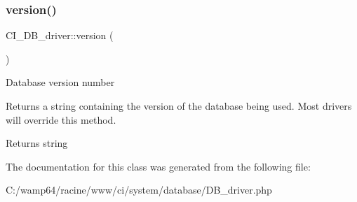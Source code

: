 \subsubsection{\texorpdfstring{version()}{version()}}
{\footnotesize\ttfamily C\+I\+\_\+\+D\+B\+\_\+driver\+::version (\begin{DoxyParamCaption}{ }\end{DoxyParamCaption})}

Database version number

Returns a string containing the version of the database being used. Most drivers will override this method.

\begin{DoxyReturn}{Returns}
string 
\end{DoxyReturn}


The documentation for this class was generated from the following file\+:\begin{DoxyCompactItemize}
\item 
C\+:/wamp64/racine/www/ci/system/database/D\+B\+\_\+driver.\+php\end{DoxyCompactItemize}
